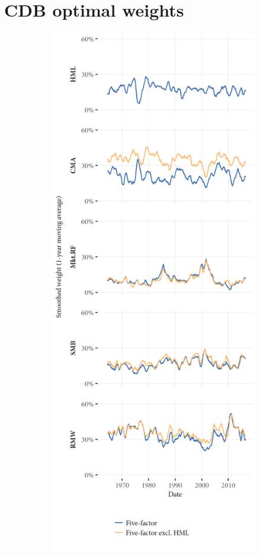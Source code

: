 
\section{CDB optimal weights} %
\label{app:cdb_weights}


\begin{figure}[htbp]
  \centering
  \footnotesize
  \begin{subfigure}{0.45\textwidth}
    \includegraphics[width=\textwidth]{graphics/weights/appendix_Weights_CDB_5F_EXCL_HML_5F.png}

\end{subfigure}
\end{figure}
